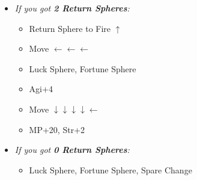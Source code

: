 \begin{spheregrid}
\begin{itemize}
\begin{itemize}
            \item \textit{If you got \textbf{2 Return Spheres}:}
            \begin{itemize}
                \yunaf Use Blk Mag Sphere on Fire $\leftarrow\uparrow$
                \item Return Sphere to Fire $\uparrow$
                \item Move $\leftarrow\leftarrow\leftarrow$
                \item Luck Sphere, Fortune Sphere
                \item Agi+4
                \item Move $\downarrow\downarrow\downarrow\downarrow\leftarrow$
                \item MP+20, Str+2
            \end{itemize}
            \item \textit{If you got \textbf{0 Return Spheres}:}
            \begin{itemize}
                \yunaf Move $\swarrow\swarrow$
                \item Luck Sphere, Fortune Sphere, Spare Change
            \end{itemize}

\end{itemize}
\end{itemize}
\end{spheregrid}
